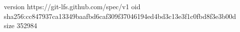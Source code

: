 version https://git-lfs.github.com/spec/v1
oid sha256:cc847937ca13349baafbd6caf309f37046194ed4bd3c13e3f1c0fbd8f3e3b00d
size 352984
